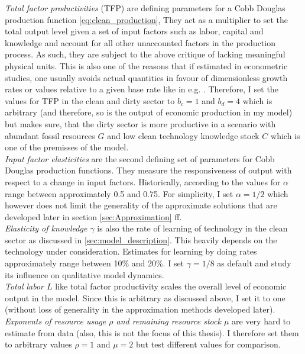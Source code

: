 \textit{Total factor productivities} (TFP) are defining parameters for a Cobb Douglas production function \eqref{eq:clean_production}, They act as a multiplier to set the total output level given a set of input factors such as labor, capital and knowledge and account for all other unaccounted factors in the production process. As such, they are subject to the above critique of lacking meaningful physical units. This is also one of the reasons that if estimated in econometric studies, one usually avoids actual quantities in favour of dimensionless growth rates or values relative to a given base rate like in e.g. \cite{Gal2013, Hooper1997, Bernstein2018}. Therefore, I set the values for TFP in the clean and dirty sector to $b_c=1$ and $b_d=4$ which is arbitrary (and therefore, so is the output of economic production in my model) but makes sure, that the dirty sector is more productive in a scenario with abundant fossil resources $G$ and low clean technology knowledge stock $C$ which is one of the premisses of the model. \\

\textit{Input factor elasticities} are the second defining set of parameters for Cobb Douglas production functions. They measure the responsiveness of output with respect to a change in input factors. Historically, according to \cite{Douglas1976} the values for $\alpha$ range between approximately 0.5 and 0.75. For simplicity, I set $\alpha=1/2$ which however does not limit the generality of the approximate solutions that are developed later in section \ref{sec:Approximation} ff.\\

\textit{Elasticity of knowledge $\gamma$} is also the rate of learning of technology in the clean sector as discussed in \ref{sec:model_description}. This heavily depends on the technology under consideration. Estimates for learning by doing rates approximately range between 10\% and 20\%. I set $\gamma=1/8$ as default and study its influence on qualitative model dynamics.\\

\textit{Total labor $L$} like total factor productivity scales the overall level of economic output in the model. Since this is arbitrary as discussed above, I set it to one (without loss of generality in the approximation methods developed later).\\

\textit{Exponents of resource usage $\rho$ and remaining resource stock $\mu$} are very hard to estimate from data (also, this is not the focus of this thesis). I therefore set them to arbitrary values $\rho=1$ and $\mu=2$ but test different values for comparison.\\

